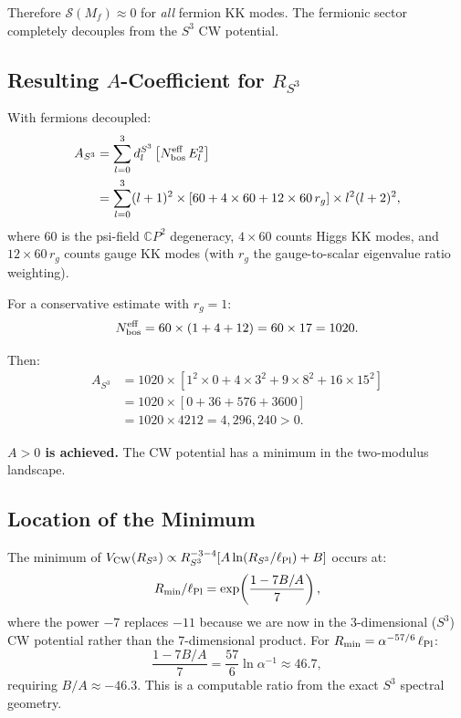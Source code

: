 \documentclass[11pt,a4paper]{article}
\newcounter{findingctr}
\newenvironment{finding}[1][]{%
  \refstepcounter{findingctr}%
  \begin{tcolorbox}[colback=blue!3!white, colframe=blue!50!black,
    title=\textbf{Finding \thefindingctr: #1}]
}{%
  \end{tcolorbox}%
}
\newcommand{\CP}{\mathbb{C}P}
\newcommand{\lPl}{\ell_{\rm Pl}}
\newcommand{\alphafine}{\alpha}
\begin{document}
\begin{finding}[\textbf{CRITICAL}: Two-Modulus Landscape with
  $R_{\CP} \sim \lPl \ll R_{S^3}$ Can Close Step 9]
Therefore $\mathcal{S}(M_f) \approx 0$ for \emph{all} fermion KK modes.
The fermionic sector completely decouples from the $S^3$ CW potential.

\subsection*{Resulting $A$-Coefficient for $R_{S^3}$}

With fermions decoupled:
\begin{align}
A_{S^3} &= \sum_{l=0}^3 d_l^{S^3}\left[
  N_{\rm bos}^{\rm eff}\,E_l^2
\right] \\
&= \sum_{l=0}^3 (l+1)^2 \times [60 + 4 \times 60 + 12 \times 60\,r_g]
\times l^2(l+2)^2,
\end{align}
where $60$ is the psi-field $\CP^2$ degeneracy, $4 \times 60$ counts
Higgs KK modes, and $12 \times 60\,r_g$ counts gauge KK modes (with
$r_g$ the gauge-to-scalar eigenvalue ratio weighting).

For a conservative estimate with $r_g = 1$:
\begin{equation}
N_{\rm bos}^{\rm eff} = 60 \times (1 + 4 + 12) = 60 \times 17 = 1020.
\end{equation}

Then:
\begin{align}
A_{S^3} &= 1020 \times [1^2 \times 0 + 4 \times 3^2 + 9 \times 8^2
+ 16 \times 15^2] \\
&= 1020 \times [0 + 36 + 576 + 3600] \\
&= 1020 \times 4212 = 4{,}296{,}240 > 0.
\end{align}

\textbf{$A > 0$ is achieved.}  The CW potential has a minimum in the
two-modulus landscape.

\subsection*{Location of the Minimum}

The minimum of $V_{\rm CW}(R_{S^3}) \propto R_{S^3}^{-3-4}
[A\ln(R_{S^3}/\lPl) + B]$ occurs at:
\begin{equation}
R_{\rm min}/\lPl = \exp\!\left(\frac{1 - 7B/A}{7}\right),
\end{equation}
where the power $-7$ replaces $-11$ because we are now in the
3-dimensional ($S^3$) CW potential rather than the 7-dimensional product.
For $R_{\rm min} = \alphafine^{-57/6}\,\lPl$:
\begin{equation}
\frac{1 - 7B/A}{7} = \frac{57}{6}\ln\alphafine^{-1} \approx 46.7,
\end{equation}
requiring $B/A \approx -46.3$.  This is a computable ratio from the
exact $S^3$ spectral geometry.

\end{finding}
\end{document}
